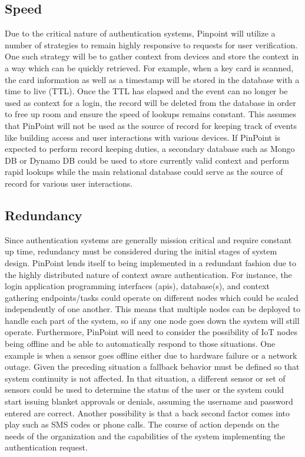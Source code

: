 \documentclass[11pt,journal]{IEEEtran}
\begin{document}
\subsection{Speed}
Due to the critical nature of authentication systems, Pinpoint will utilize a number of strategies to remain highly responsive to requests for user verification.  One such strategy will be to gather context from devices and store the context in a way which can be quickly retrieved.  For example, when a key card is scanned, the card information as well as a timestamp will be stored in the database with a time to live (TTL).  Once the TTL has elapsed and the event can no longer be used as context for a login, the record will be deleted from the database in order to free up room and ensure the speed of lookups remains constant.  This assumes that PinPoint will not be used as the source of record for keeping track of events like building access and user interactions with various devices.  If PinPoint is expected to perform record keeping duties, a secondary database such as Mongo DB or Dynamo DB could be used to store currently valid context and perform rapid lookups while the main relational database could serve as the source of record for various user interactions.

\subsection{Redundancy}
Since authentication systems are generally mission critical and require constant up time, redundancy must be considered during the initial stages of system design.  PinPoint lends itself to being implemented in a redundant fashion due to the highly distributed nature of context aware authentication.  For instance, the login application programming interfaces (apis), database(s), and context gathering endpoints/tasks could operate on different nodes which could be scaled independently of one another.  This means that multiple nodes can be deployed to handle each part of the system, so if any one node goes down the system will still operate.  Furthermore, PinPoint will need to consider the possibility of IoT nodes being offline and be able to automatically respond to those situations.  One example is when a sensor goes offline either due to hardware failure or a network outage.  Given the preceding situation a fallback behavior must be defined so that system continuity is not affected.  In that situation, a different sensor or set of sensors could be used to determine the status of the user or the system could start issuing blanket approvals or denials, assuming the username and password entered are correct.  Another possibility is that a back second factor comes into play such as SMS codes or phone calls.  The course of action depends on the needs of the organization and the capabilities of the system implementing the authentication request.
\end{document}
